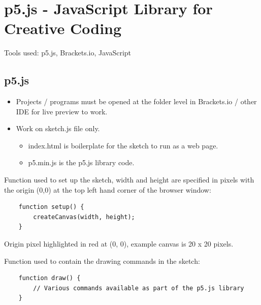 \documentclass{article}
\begin{document}
\newpage
\section{p5.js - JavaScript Library for Creative Coding}
Tools used: p5.js, Brackets.io, JavaScript

\subsection*{p5.js}
\begin{itemize}
    \item Projects / programs must be opened at the folder level in Brackets.io / other IDE for live preview to work.
    \item Work on sketch.js file only. 
        \begin{itemize}
            \item index.html is boilerplate for the sketch to run as a web page.
            \item p5.min.js is the p5.js library code.
        \end{itemize}
\end{itemize}

\vspace*{0.5cm}
\noindent Function used to set up the sketch, width and height are specified in pixels with the origin (0,0) at the top left hand corner of the browser window:

\vspace*{0.25cm}
\begin{verbatim}
    function setup() {
        createCanvas(width, height);
    }
    \end{verbatim}


\begin{center}

\vspace*{0.5cm}
Origin pixel highlighted in red at (0, 0), example canvas is 20 x 20 pixels.
\end{center}

\newpage
\noindent Function used to contain the drawing commands in the sketch:
\begin{verbatim}
    function draw() {
        // Various commands available as part of the p5.js library
    }
    \end{verbatim}
\end{document}
